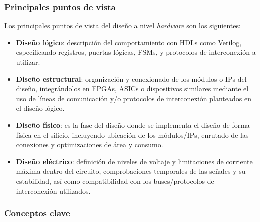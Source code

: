 \subsubsection{Principales puntos de vista}

Los principales puntos de vista del diseño a nivel \textit{hardware} son los siguientes:

\begin{itemize}
    \item \textbf{Diseño lógico}: descripción del comportamiento con HDLs como Verilog, especificando registros, puertas lógicas, \ac{FSM}s, y protocolos de interconexión a utilizar.
    
    \item \textbf{Diseño estructural}: organización y conexionado de los módulos o IPs del diseño, integrándolos en FPGAs, ASICs o dispositivos similares mediante el uso de líneas de comunicación y/o protocolos de interconexión planteados en el diseño lógico.
    
    \item \textbf{Diseño físico}: es la fase del diseño donde se implementa el diseño de forma física en el silicio, incluyendo ubicación de los módulos/IPs, enrutado de las conexiones y optimizaciones de área y consumo.
    
    \item \textbf{Diseño eléctrico}: definición de niveles de voltaje y limitaciones de corriente máxima dentro del circuito, comprobaciones temporales de las señales y su estabilidad, así como compatibilidad con los buses/protocolos de interconexión utilizados.
\end{itemize}

\subsubsection{Conceptos clave}

